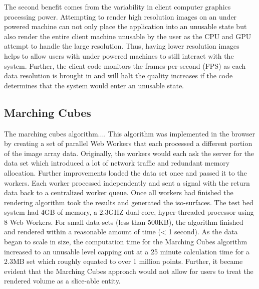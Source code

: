 \documentclass[annual]{acmsiggraph}
\begin{document}
The second benefit comes from the variability in client computer graphics processing power.  Attempting to render high resolution images on an under powered machine can not only place the application into an unusable state but also render the entire client machine unusable by the user as the CPU and GPU attempt to handle the large resolution.  Thus, having lower resolution images helps to allow users with under powered machines to still interact with the system.  Further, the client code monitors the frames-per-second (FPS) as each data resolution is brought in and will halt the quality increases if the code determines that the system would enter an unusable state.

\subsection{Marching Cubes}
	The marching cubes algorithm....
	This algorithm was implemented in the browser by creating a set of parallel Web Workers that each processed a different portion of the image array data.  Originally, the workers would each ask the server for the data set which introduced a lot of network traffic and redundant memory allocation.  Further improvements loaded the data set once and passed it to the workers.  Each worker processed independently and sent a signal with the return data back to a centralized worker queue.  Once all workers had finished the rendering algorithm took the results and generated the iso-surfaces.  
	The test bed system had 4GB of memory, a 2.3GHZ dual-core, hyper-threaded processor using 8 Web Workers.  For small data-sets (less than 500KB), the algorithm finished and rendered within a reasonable amount of time (< 1 second).  As the data began to scale in size, the computation time for the Marching Cubes algorithm increased to an unusable level capping out at a 25 minute calculation time for a 2.3MB set which roughly equated to over 1 million points.  Further, it became evident that the Marching Cubes approach would not allow for users to treat the rendered volume as a slice-able entity.
\end{document}
